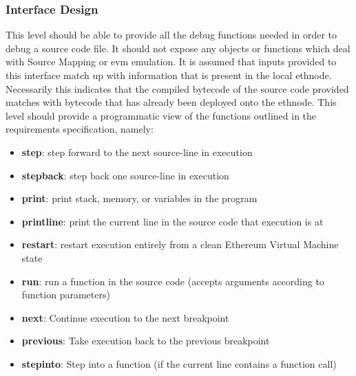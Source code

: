 \documentclass{report}
\begin{document}
    \subsubsection{Interface Design}
        This level should be able to provide all the debug functions needed in order to debug a source code file. It should not expose any objects or functions which deal with Source Mapping or \Gls{evm} emulation. It is assumed that inputs provided to this interface match up with information that is present in the local \Gls{ethnode}. Necessarily this indicates that the compiled bytecode of the source code provided matches with bytecode that has already been deployed onto the \Gls{ethnode}. This level should provide a programmatic view of the functions outlined in the requirements specification, namely:
    \begin{itemize}
        \item \textbf{step}: step forward to the next source-line in execution
        \item \textbf{stepback}: step back one source-line in execution
        \item \textbf{print}: print stack, memory, or variables in the program
        \item \textbf{printline}: print the current line in the source code that execution is at
        \item \textbf{restart}: restart execution entirely from a clean Ethereum Virtual Machine state
        \item \textbf{run}: run a function in the source code (accepts arguments according to function parameters)
        \item \textbf{next}: Continue execution to the next breakpoint
        \item \textbf{previous}: Take execution back to the previous breakpoint
        \item \textbf{stepinto}: Step into a function (if the current line contains a function call)
    \end{itemize}
\end{document}
